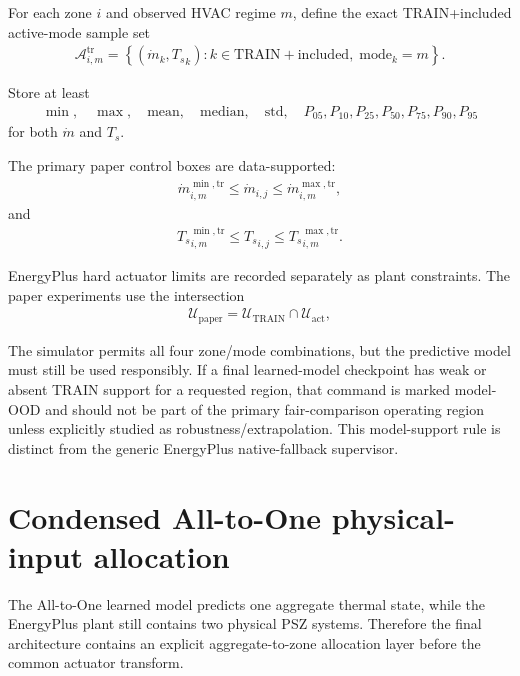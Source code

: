 \documentclass[11pt]{article}
\newcommand{\Ts}{T_s}
\newcommand{\mdot}{\dot m}
\begin{document}
For each zone \(i\) and observed HVAC regime \(m\), define the exact TRAIN+included active-mode
sample set
\begin{align}
\mathcal A_{i,m}^{\mathrm{tr}}
=
\left\{
(\mdot_k,{\Ts}_k):
k\in\mathrm{TRAIN+included},\;
\mathrm{mode}_k=m
\right\}.
\tag{6.35}
\end{align}

Store at least
\begin{align}
\min,\quad
\max,\quad
\mathrm{mean},\quad
\mathrm{median},\quad
\mathrm{std},\quad
P_{05},P_{10},P_{25},P_{50},P_{75},P_{90},P_{95}
\tag{6.36}
\end{align}
for both \(\mdot\) and \(\Ts\).

The primary paper control boxes are data-supported:
\begin{align}
\boxed{
\mdot_{i,m}^{\min,\mathrm{tr}}
\le
\mdot_{i,j}
\le
\mdot_{i,m}^{\max,\mathrm{tr}},
}
\tag{6.37}
\end{align}
and
\begin{align}
\boxed{
{\Ts}_{i,m}^{\min,\mathrm{tr}}
\le
{\Ts}_{i,j}
\le
{\Ts}_{i,m}^{\max,\mathrm{tr}}.
}
\tag{6.38}
\end{align}

EnergyPlus hard actuator limits are recorded separately as plant constraints.  The paper
experiments use the intersection
\begin{align}
\boxed{
\mathcal U_{\mathrm{paper}}
=
\mathcal U_{\mathrm{TRAIN}}
\cap
\mathcal U_{\mathrm{act}},
}
\tag{6.39}
\end{align}

The simulator permits all four zone/mode combinations, but the predictive
model must still be used responsibly.  If a final learned-model checkpoint has
weak or absent TRAIN support for a requested region, that command is marked
model-OOD and should not be part of the primary fair-comparison operating
region unless explicitly studied as robustness/extrapolation.  This
model-support rule is distinct from the generic EnergyPlus native-fallback
supervisor.

\section{Condensed All-to-One physical-input allocation}

The All-to-One learned model predicts one aggregate thermal state, while the
EnergyPlus plant still contains two physical PSZ systems.  Therefore the final
architecture contains an explicit aggregate-to-zone allocation layer before
the common actuator transform.
\end{document}
